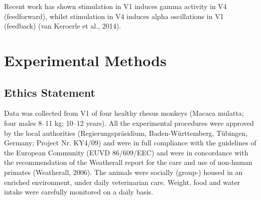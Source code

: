 Recent work has shown stimulation in \ac{V1} induces gamma activity in \ac{V4} (feedforward), whilst stimulation in \ac{V4} induces alpha oscillations in \ac{V1} (feedback) (van Keroerle et al., 2014).
\section{Experimental Methods}
\subsection{Ethics Statement}
Data was collected from \ac{V1} of four healthy rhesus monkeys (Macaca mulatta; four males 8--11 kg; 10--12 years). All the experimental procedures were approved by the local authorities (Regierungspr\"asidium, Baden-W\"urttemberg, T\"ubingen, Germany; Project Nr. KY4/09) and were in full compliance with the guidelines of the European Community (EUVD 86/609/EEC) and were in concordance with the recommendation of the Weatherall report for the care and use of non-human primates (Weatherall, 2006). The animals were socially (group-) housed in an enriched environment, under daily veterinarian care. Weight, food and water intake were carefully monitored on a daily basis.

